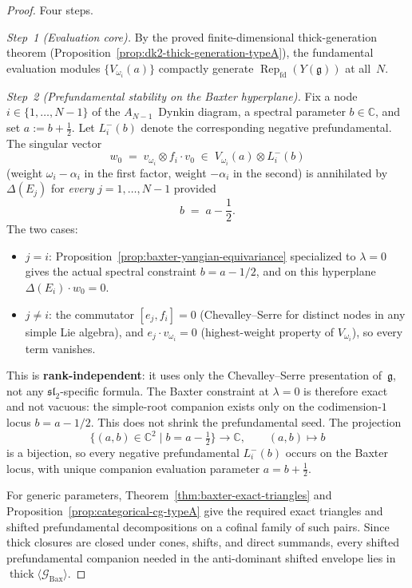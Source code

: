 \begin{proof}
Four steps.

\smallskip\noindent\textit{Step~1 (Evaluation core).}
By the proved finite-dimensional thick-generation theorem
\textup{(}Proposition~\ref{prop:dk2-thick-generation-typeA}\textup{)},
the fundamental evaluation modules $\{V_{\omega_i}(a)\}$ compactly
generate $\operatorname{Rep}_{\mathrm{fd}}(Y(\mathfrak{g}))$ at
all~$N$.

\smallskip\noindent\textit{Step~2 (Prefundamental stability on the
Baxter hyperplane).}
Fix a node $i \in \{1, \ldots, N{-}1\}$ of the $A_{N-1}$~Dynkin diagram,
a spectral parameter $b \in \mathbb{C}$, and set
$a := b + \tfrac{1}{2}$. Let $L^-_{i}(b)$ denote the corresponding negative
prefundamental. The singular vector
\begin{equation}\label{eq:baxter-sv-prefundamental}
 w_0 \;=\; v_{\omega_i} \otimes f_i \cdot v_0
 \;\in\; V_{\omega_i}(a) \otimes L^-_i(b)
\end{equation}
(weight $\omega_i - \alpha_i$ in the first factor, weight
$-\alpha_i$ in the second) is annihilated by
$\Delta(E_j)$ for \emph{every} $j = 1, \ldots, N{-}1$ provided
\[
 b \;=\; a - \frac{1}{2}.
\]
The two cases:
\begin{itemize}[nosep]
\item $j = i$: Proposition~\ref{prop:baxter-yangian-equivariance}
 specialized to $\lambda = 0$ gives the actual spectral
 constraint $b = a - 1/2$, and on this hyperplane
 $\Delta(E_i)\cdot w_0 = 0$.
\item $j \neq i$: the commutator $[e_j, f_i] = 0$
 (Chevalley--Serre for distinct nodes in any simple
 Lie algebra), and $e_j \cdot v_{\omega_i} = 0$
 (highest-weight property of $V_{\omega_i}$), so every
 term vanishes.
\end{itemize}
\noindent
This is \textbf{rank-independent}: it uses only the
Chevalley--Serre presentation of~$\mathfrak{g}$,
not any $\mathfrak{sl}_2$-specific formula.
The Baxter constraint at $\lambda = 0$ is therefore exact and not
vacuous: the simple-root companion exists only on the codimension-$1$
locus $b = a - 1/2$. This does not shrink the prefundamental seed. The
projection
\[
\{(a,b) \in \mathbb{C}^2 \mid b = a - \tfrac{1}{2}\}
\longrightarrow \mathbb{C},
\qquad
(a,b) \longmapsto b
\]
is a bijection, so every negative prefundamental $L^-_{i}(b)$ occurs on
the Baxter locus, with unique companion evaluation parameter
$a = b + \tfrac{1}{2}$.

For generic parameters, Theorem~\ref{thm:baxter-exact-triangles} and
Proposition~\ref{prop:categorical-cg-typeA} give the required exact
triangles and shifted prefundamental decompositions on a cofinal family
of such pairs. Since thick closures are closed under cones, shifts,
and direct summands, every shifted prefundamental companion needed in
the anti-dominant shifted envelope lies in
$\operatorname{thick}\langle \mathcal{G}_{\mathrm{Bax}}\rangle$.


\end{proof}
